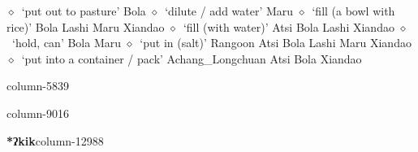 \hspace{1ex}
         $\diamond$~`put out to pasture'
         Bola 
\hspace{1ex}
         $\diamond$~`dilute / add water'
         Maru 
\hspace{1ex}
         $\diamond$~`fill (a bowl with rice)'
         Bola 
\hspace{1ex}
         Lashi 
\hspace{1ex}
         Maru 
\hspace{1ex}
         Xiandao 
\hspace{1ex}
         $\diamond$~`fill (with water)'
         Atsi 
\hspace{1ex}
         Bola 
\hspace{1ex}
         Lashi 
\hspace{1ex}
         Xiandao 
\hspace{1ex}
         $\diamond$~`hold, can'
         Bola 
\hspace{1ex}
         Maru 
\hspace{1ex}
         $\diamond$~`put in (salt)'
         Rangoon 
\hspace{1ex}
         Atsi 
\hspace{1ex}
         Bola 
\hspace{1ex}
         Lashi 
\hspace{1ex}
         Maru 
\hspace{1ex}
         Xiandao 
\hspace{1ex}
         $\diamond$~`put into a container / pack'
         Achang\_Longchuan 
\hspace{1ex}
         Atsi 
\hspace{1ex}
         Bola 
\hspace{1ex}
         Xiandao 
  \item {\footnotesize \textbf{}}{\tiny column-5839}
  \item {\footnotesize \textbf{}}{\tiny column-9016}
  \item {\footnotesize \textbf{*ʔkik}}{\tiny column-12988}
